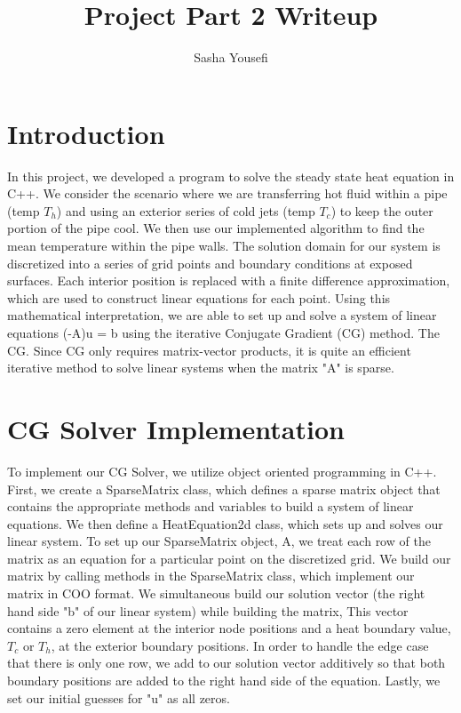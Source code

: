 \documentclass{article}
\title{Project Part 2 Writeup}
\author{Sasha Yousefi}
\begin{document}
\maketitle
\section{Introduction}
In this project, we developed a program to solve the steady state heat equation in C++. We consider the scenario where we are transferring hot fluid within a pipe (temp $T_h$) and using an exterior series of cold jets (temp $T_c$) to keep the outer portion of the pipe cool. We then use our implemented algorithm to find the mean temperature within the pipe walls. The solution domain for our system is discretized into a series of grid points and boundary conditions at exposed surfaces. Each interior position is replaced with a finite difference approximation, which are used to construct linear equations for each point. Using this mathematical interpretation, we are able to set up and solve a system of linear equations (-A)u = b using the iterative Conjugate Gradient (CG) method. The CG. Since CG only requires matrix-vector products, it is quite an efficient iterative method to solve linear systems when the matrix "A" is sparse.\cite{CME211:2021:FinalProjectPart1}\cite{CME211:2021:FinalProjectPart2}
\section{CG Solver Implementation}
To implement our CG Solver, we utilize object oriented programming in C++. First, we create a SparseMatrix class, which defines a sparse matrix object that contains the appropriate methods and variables to build a system of linear equations. We then define a HeatEquation2d class, which sets up and solves our linear system. To set up our SparseMatrix object, A, we treat each row of the matrix as an equation for a particular point on the discretized grid. We build our matrix by calling methods in the SparseMatrix class, which implement our matrix in COO format. We simultaneous build our solution vector (the right hand side "b" of our linear system) while building the matrix, This vector contains a zero element at the interior node positions and a heat boundary value, $T_c$ or $T_h$, at the exterior boundary positions. In order to handle the edge case that there is only one row, we add to our solution vector additively so that both boundary positions are added to the right hand side of the equation. Lastly, we set our initial guesses for "u" as all zeros. 
\end{document}

